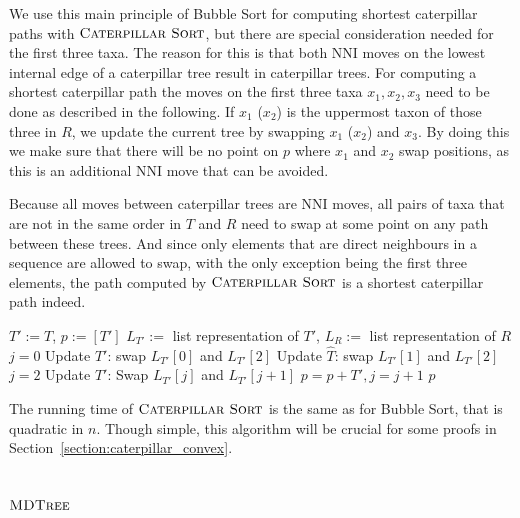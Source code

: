 \documentclass{amsart}
\newcommand{\nni}{\mathrm{NNI}}
\newcommand{\csort}{\textsc{Caterpillar Sort}}
\newcommand{\mdtree}{\textsc{MDTree}}
\begin{document}
We use this main principle of Bubble Sort for computing shortest caterpillar paths with $\csort$, but there are special consideration needed for the first three taxa.
The reason for this is that both $\nni$ moves on the lowest internal edge of a caterpillar tree result in caterpillar trees.
For computing a shortest caterpillar path the moves on the first three taxa $x_1, x_2, x_3$ need to be done as described in the following.
If $x_1$ ($x_2$) is the uppermost taxon of those three in $R$, we update the current tree by swapping $x_1$ ($x_2$) and $x_3$.
By doing this we make sure that there will be no point on $p$ where $x_1$ and $x_2$ swap positions, as this is an additional $\nni$ move that can be avoided.

Because all moves between caterpillar trees are $\nni$ moves, all pairs of taxa that are not in the same order in $T$ and $R$ need to swap at some point on any path between these trees.
And since only elements that are direct neighbours in a sequence are allowed to swap, with the only exception being the first three elements, the path computed by $\csort$ is a shortest caterpillar path indeed.

\begin{algorithm}[H]
\caption{$\csort$($T,R$)}
\label{alg:csort}
\begin{algorithmic}[1]
\STATE $T':= T$, $p := [T']$
\STATE $L_{T'}:=$ list representation of $T'$, $L_R:=$ list representation of $R$
 \label{alg:csort:line:loop}
\STATE $j = 0$ 
\STATE Update $T'$: swap $L_{T'}[0]$ and $L_{T'}[2]$
\STATE Update $\hat T$: swap $L_{T'}[1]$ and $L_{T'}[2]$
\ENDIF
\STATE $j = 2$
\STATE Update $T'$: Swap $L_{T'}[j]$ and $L_{T'}[j+1]$
\STATE $p = p+T', j = j + 1$
\ENDWHILE
\ENDFOR
\RETURN $p$
\end{algorithmic}
\end{algorithm}

The running time of $\csort$ is the same as for Bubble Sort, that is quadratic in $n$.
Though simple, this algorithm will be crucial for some proofs in Section~\ref{section:caterpillar_convex}.


\subsection{$\mdtree$}
\label{section:alg_mdtree}
\end{document}

